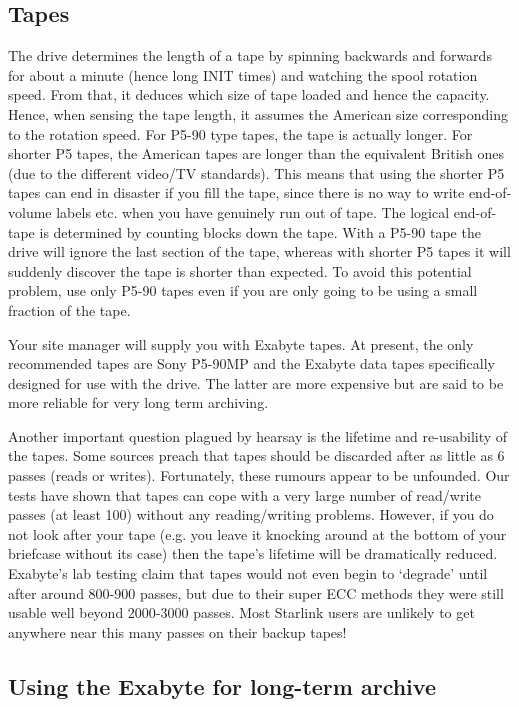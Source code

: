 \subsection {Tapes}

The drive determines the length of a tape by  spinning backwards and forwards
for about a minute (hence long INIT times) and watching the spool
rotation speed. From that, it
deduces which size of tape loaded and hence the capacity.
Hence, when sensing the tape length, it assumes
the American size corresponding to the rotation speed. For P5-90 type tapes,
the tape is
actually longer. For shorter P5 tapes, the American tapes are
longer than the equivalent British ones (due to the different video/TV
standards). This means that using the shorter P5 tapes can end in disaster  if
you fill the tape, since there is no way to write end-of-volume labels etc.
when you have genuinely run out of tape. The logical end-of-tape is determined by
counting blocks down the tape. With a P5-90 tape the drive will ignore the last section
of the tape, whereas with shorter P5 tapes it will suddenly
discover the tape is shorter than expected.
To avoid this potential problem, use only P5-90 tapes even if you are only
going to be using a small fraction of the tape.

Your site manager will supply you with Exabyte tapes.
At present, the only recommended tapes are Sony P5-90MP and the Exabyte
data tapes specifically designed for use with the drive. The latter
are more expensive but are said to be more reliable for very long term
archiving.

Another important question plagued by hearsay is the lifetime and re-usability
of the tapes. Some sources preach  that tapes should be discarded
after as little as 6 passes (reads or writes).
Fortunately, these rumours appear to be unfounded. Our tests have
shown
that tapes can cope with a very large number of read/write
passes  (at least 100) without any reading/writing problems. However,
if you do not look after your tape (e.g. you leave it knocking around at the
bottom of your briefcase without its case) then the tape's lifetime will be
dramatically reduced.
Exabyte's lab testing claim that tapes would not
even begin to `degrade' until after around 800-900 passes, but due to their
super ECC methods they were still usable well beyond 2000-3000 passes.
Most Starlink users are unlikely to get anywhere near this many passes on
their backup tapes!

\subsection{Using the Exabyte for long-term archive}

